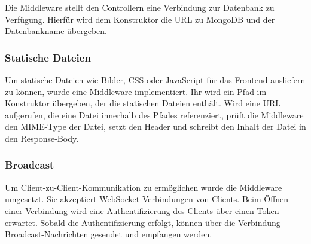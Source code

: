 Die Middleware  stellt den Controllern eine Verbindung zur
Datenbank zu Verfügung.  Hierfür wird dem Konstruktor die URL zu MongoDB und
der Datenbankname übergeben.

\subsubsection{Statische Dateien}
\label{sssec:bam_statische_dateien}

Um statische Dateien wie Bilder, CSS oder JavaScript für das Frontend
ausliefern zu können, wurde eine Middleware  implementiert.
Ihr wird ein Pfad im Konstruktor übergeben, der die statischen Dateien
enthält.  Wird eine URL aufgerufen, die eine Datei innerhalb des Pfades
referenziert, prüft die Middleware den MIME-Type der Datei, setzt den Header
 und schreibt den Inhalt der Datei in den Response-Body.

\subsubsection{Broadcast}
\label{sssec:bam_broadcast}

Um Client-zu-Client-Kommunikation zu ermöglichen wurde die Middleware
 umgesetzt.  Sie akzeptiert WebSocket-Verbindungen von Clients.
Beim Öffnen einer Verbindung wird eine Authentifizierung des Clients über einen
Token erwartet.  Sobald die Authentifizierung erfolgt, können über die
Verbindung Broadcast-Nachrichten gesendet und empfangen werden.
